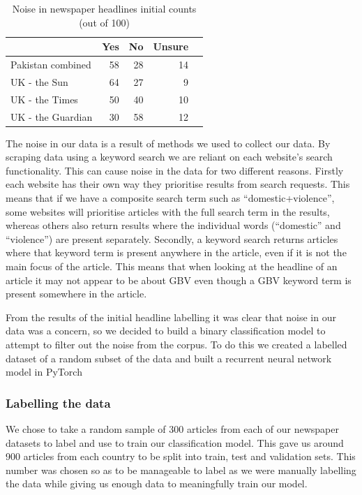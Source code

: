 \documentclass{article}
\begin{document}
{{\begin{table}[!htp]\centering
	\caption{Noise in newspaper headlines initial counts (out of 100)}\label{tab: }
	\scriptsize
	\begin{tabular}{lrrrr}\toprule
		&Yes &No &Unsure \\\midrule
		Pakistan combined &58 &28 &14 \\
		UK - the Sun &64 &27 &9 \\
		UK - the Times &50 &40 &10 \\
		UK - the Guardian &30 &58 &12 \\
		\bottomrule
	\end{tabular}
\end{table}

The noise in our data is a result of methods we used to collect our data. By scraping data using a keyword search we are reliant on each website’s search functionality. This can cause noise in the data for two different reasons. Firstly each website has their own way they prioritise results from search requests. This means that if we have a composite search term such as “domestic+violence”, some websites will prioritise articles with the full search term in the results, whereas others also return results where the individual words (“domestic” and “violence”) are present separately. Secondly, a keyword search returns articles where that keyword term is present anywhere in the article, even if it is not the main focus of the article. This means that when looking at the headline of an article it may not appear to be about GBV even though a GBV keyword term is present somewhere in the article. 

From the results of the initial headline labelling it was clear that noise in our data was a concern, so we decided to build a binary classification model to attempt to filter out the noise from the corpus. To do this we created a labelled dataset of a random subset of the data and built a recurrent neural network model in PyTorch

\subsubsection{Labelling the data}{
We chose to take a random sample of 300 articles from each of our newspaper datasets to label and use to train our classification model. This gave us around 900 articles from each country to be split into train, test and validation sets. This number was chosen so as to be manageable to label as we were manually labelling the data while giving us enough data to meaningfully train our model. 

}}}
\end{document}
